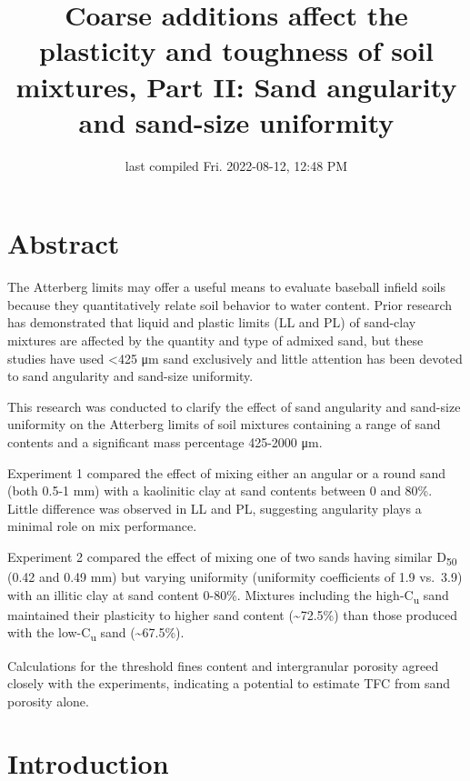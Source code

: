 \documentclass[
  letterpaper,
]{article}
\title{Coarse additions affect the plasticity and toughness of soil mixtures, Part II: Sand angularity and sand-size uniformity}
\author{}
\date{\vspace{-2.5em}last compiled Fri. 2022-08-12, 12:48 PM}
\begin{document}
\maketitle

{
\hypersetup{linkcolor=blue}
\setcounter{tocdepth}{2}
\tableofcontents
}
\linenumbers

\hypertarget{abstract}{%
\section{Abstract}\label{abstract}}

The Atterberg limits may offer a useful means to evaluate baseball infield soils because they quantitatively relate soil behavior to water content.
Prior research has demonstrated that liquid and plastic limits (LL and PL) of sand-clay mixtures are affected by the quantity and type of admixed sand, but these studies have used \textless425 μm sand exclusively and little attention has been devoted to sand angularity and sand-size uniformity.

This research was conducted to clarify the effect of sand angularity and sand-size uniformity on the Atterberg limits of soil mixtures containing a range of sand contents and a significant mass percentage 425-2000 μm.

Experiment 1 compared the effect of mixing either an angular or a round sand (both 0.5-1 mm) with a kaolinitic clay at sand contents between 0 and 80\%.
Little difference was observed in LL and PL, suggesting angularity plays a minimal role on mix performance.

Experiment 2 compared the effect of mixing one of two sands having similar D\textsubscript{50} (0.42 and 0.49 mm) but varying uniformity (uniformity coefficients of 1.9 vs.~3.9) with an illitic clay at sand content 0-80\%.
Mixtures including the high-C\textsubscript{u} sand maintained their plasticity to higher sand content (\textasciitilde72.5\%) than those produced with the low-C\textsubscript{u} sand (\textasciitilde67.5\%).

Calculations for the threshold fines content and intergranular porosity agreed closely with the experiments, indicating a potential to estimate TFC from sand porosity alone.

\hypertarget{introduction}{%
\section{Introduction}\label{introduction}}
\end{document}

